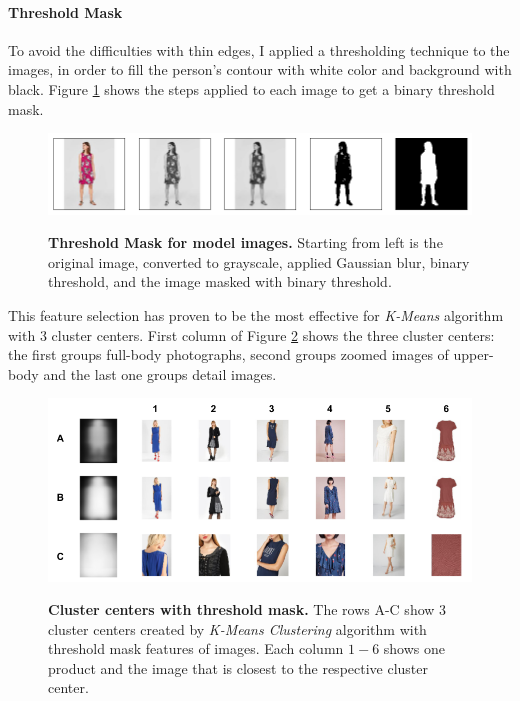 \documentclass[12pt]{report}
\begin{document}
\paragraph{Threshold Mask}
To avoid the difficulties with thin edges, I applied a thresholding technique to the images, in order to fill the person's contour with white color and background with black. Figure \ref{fig:cluster_outline_data} shows the steps applied to each image to get a binary threshold mask.

\begin{figure}[h]
\centering
{\includegraphics[width=\linewidth]{04_experiments/clustering/outlines_data}}
\caption{\label{fig:cluster_outline_data} \textbf{Threshold Mask for model images.} Starting from left is the original image, converted to grayscale, applied Gaussian blur, binary threshold, and the image masked with binary threshold.}
\end{figure}

This feature selection has proven to be the most effective for \textit{K-Means} algorithm with 3 cluster centers. First column of Figure \ref{fig:cluster_outline} shows the three cluster centers: the first groups full-body photographs, second groups zoomed images of upper-body and the last one groups detail images. 

\begin{figure}[h]
\centering
{\includegraphics[width=\linewidth]{04_experiments/clustering/outlines_clusters}}
\caption{\label{fig:cluster_outline} \textbf{Cluster centers with threshold mask.} The rows A-C show 3 cluster centers created by \textit{K-Means Clustering} algorithm with threshold mask features of images. Each column $1-6$ shows one product and the image that is closest to the respective cluster center.}
\end{figure}
\end{document}
